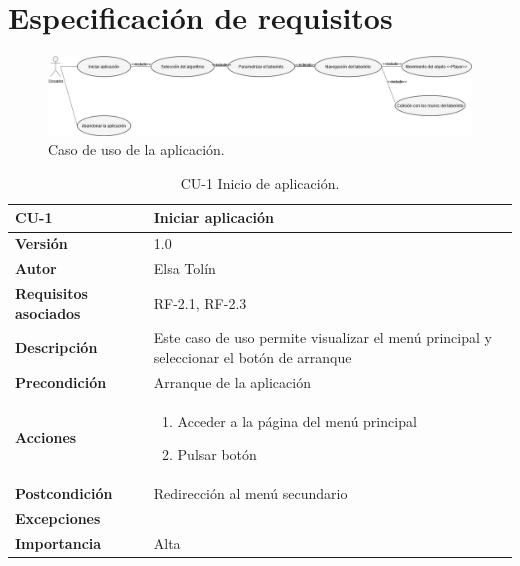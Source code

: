 \section{Especificación de requisitos}
\begin{figure}[!h]  
    \centering  
    \includegraphics[width=\textwidth]{img/CasosUso.png}  
    \caption{Caso de uso de la aplicación.}  
    \label{fig:CasosDeUso}
\end{figure}
\begin{table}[p]
	\centering
	\begin{tabularx}{\linewidth}{ p{} p{} }
			\toprule
			\textbf{CU-1}    & \textbf{Iniciar aplicación}\\
			\toprule
			\textbf{Versión}              & 1.0    \\
			\textbf{Autor}                & Elsa Tolín \\
			\textbf{Requisitos asociados} & RF-2.1, RF-2.3 \\
			\textbf{Descripción}          & Este caso de uso permite visualizar el menú principal y seleccionar el botón de arranque\\
			\textbf{Precondición}         & Arranque de la aplicación\\
			\textbf{Acciones}             &
			\begin{enumerate}
					\def\labelenumi{\arabic{enumi}.}
					\tightlist
					\item Acceder a la página del menú principal
					\item Pulsar botón
				\end{enumerate}\\
			\textbf{Postcondición}        & Redirección al menú secundario\\
			\textbf{Excepciones}          &  \\
			\textbf{Importancia}          & Alta\\
			\bottomrule
		\end{tabularx}
	\caption{CU-1 Inicio de aplicación.}
\end{table}


